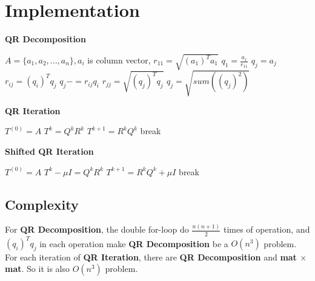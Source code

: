 \documentclass{article}
\begin{document}
\section{Implementation}
\begin{algorithm}[H]
    \caption{\textbf{QR Decomposition}}
    \begin{algorithmic}
        \State $A = \{a_1, a_2, ..., a_n\}, a_i$ is column vector,
        \State $r_{11} = \sqrt{(a_1)^Ta_1}$
        \State $q_1 = \frac{a_1}{r_{11}}$
            \State $q_j = a_j$
                \State $r_{ij} = (q_i)^Tq_j$
                \State $q_j -= r_{ij}q_i$
            \EndFor
            \State $r_{jj} = \sqrt{(q_j)^Tq_j}$
            \State $q_j = \sqrt{sum((q_j)^2)}$
        \EndFor
    \end{algorithmic}
\end{algorithm}
\begin{algorithm}[H]
    \caption{\textbf{QR Iteration}}
    \begin{algorithmic}
        \State $T^{(0)} = A$
            \State $T^k = Q^kR^k$
            \State $T^{k+1} = R^kQ^k$
                \State break
            \EndIf
        \EndFor
    \end{algorithmic}
\end{algorithm}
\begin{algorithm}[H]
    \caption{\textbf{Shifted QR Iteration}}
    \begin{algorithmic}
        \State $T^{(0)} = A$
            \State $T^k - {\mu}I = Q^kR^k$
            \State $T^{k+1} = R^kQ^k + {\mu}I$
                \State break
            \EndIf
        \EndFor
    \end{algorithmic}
\end{algorithm}
\subsection{Complexity}
\label{sec:complexity}
For \textbf{QR Decomposition}, the double for-loop do $\frac{n(n+1)}{2}$ times of operation, and $(q_i)^Tq_j$ in each
operation make \textbf{QR Decomposition} be a {\boldmath$O(n^3)$} problem. \newline
For each iteration of \textbf{QR Iteration}, there are \textbf{QR Decomposition} and \textbf{mat {\boldmath$\times$} mat}. 
So it is also {\boldmath$O(n^3)$} problem.
\end{document}
